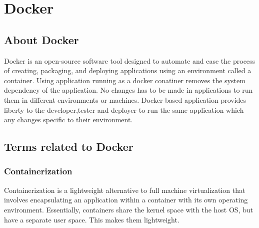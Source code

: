 \documentclass[12pt]{report}
\begin{document}
\chapter{Docker}
\section{About Docker}
Docker is an open-source software tool designed to automate and ease the process of creating, packaging, and deploying applications using an environment called a container. Using application running as a docker conatiner removes the system dependency of the application. No changes has to be made in applications to run them in different environments or machines. Docker based application provides liberty to the developer,tester and deployer to run the same application which any changes specific to their environment. \cite{Docker}
\section{Terms related to Docker}
\subsection{Containerization}
Containerization is a lightweight alternative to full machine virtualization that involves encapsulating an application within a container with its own operating environment. Essentially, containers share the kernel space with the host OS, but have a separate user space. This makes them lightweight.
\end{document}
